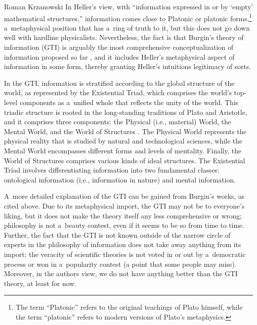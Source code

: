 \begin{artengenv}{Roman Krzanowski}
In Heller's view, with ``information expressed in or by ‘empty' mathematical structures,'' information comes close to Platonic or platonic forms,\footnote{The term ``Platonic'' refers to the original teachings of Plato himself, while the term ``platonic'' refers to modern versions of Plato's metaphysics.} a~metaphysical position that has a~ring of truth to it, but this does not go down well with hardline physicalists. Nevertheless, the fact is that Burgin's theory of information (GTI) is arguably the most comprehensive conceptualization of information proposed so far 
\parencites[][]{burgin_information_2003}[][]{burgin_theory_2010}[][]{burgin_structural_2017}[][]{burgin_structural_2017}[][]{burgin_is_2022}, %
 and it includes Heller's metaphysical aspect of information in some form, thereby granting Heller's intuitions legitimacy of sorts.



In the GTI, information is stratified according to the global structure of the world, as represented by the Existential Triad, which comprises the world's top-level components as a~unified whole that reflects the unity of the world. This triadic structure is rooted in the long-standing traditions of Plato and Aristotle, and it comprises three components: the Physical (i.e., material) World, the Mental World, and the World of Structures 
\parencites[][]{burgin_theory_2010}[][]{burgin_structural_2017}. %
 The Physical World represents the physical reality that is studied by natural and technological sciences, while the Mental World encompasses different forms and levels of mentality. Finally, the World of Structures comprises various kinds of ideal structures. The Existential Triad involves differentiating information into two fundamental classes: ontological information (i.e., information in nature) and mental information.



A~more detailed explanation of the GTI can be gained from Burgin's works, as cited above. Due to its metaphysical import, the GTI may not be to everyone's liking, but it does not make the theory itself any less comprehensive or wrong; philosophy is not a~beauty contest, even if it seems to be so from time to time. Further, the fact that the GTI is not known outside of the narrow circle of experts in the philosophy of information does not take away anything from its import; the veracity of scientific theories is not voted in or out by a~democratic process or won in a~popularity contest (a point that some people may miss). Moreover, in the authors view, we do not have anything better than the GTI theory, at least for now.




\end{artengenv}

